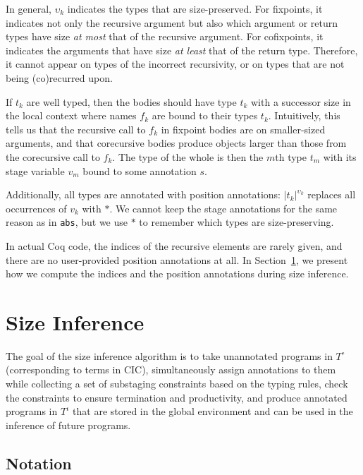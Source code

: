 \documentclass[sigplan,10pt,anonymous,review,nonacm]{acmart}
\begin{document}
In general, $\upsilon_k$ indicates the types that are size-preserved. For fixpoints, it indicates not only the recursive argument but also which argument or return types have size \textit{at most} that of the recursive argument. For cofixpoints, it indicates the arguments that have size \textit{at least} that of the return type. Therefore, it cannot appear on types of the incorrect recursivity, or on types that are not being (co)\-recurred upon. 

If $t_k$ are well typed, then the \cofixpoint bodies should have type $t_k$ with a successor size in the local context where \cofixpoint names $f_k$ are bound to their types $t_k$. Intuitively, this tells us that the recursive call to $f_k$ in fixpoint bodies are on smaller-sized arguments, and that corecursive bodies produce objects larger than those from the corecursive call to $f_k$. The type of the whole \cofixpoint is then the $m$th type $t_m$ with its stage variable $v_m$ bound to some annotation $s$.

Additionally, all \cofixpoint types are annotated with position annotations: $|t_k|^{\upsilon_k}$ replaces all occurrences of $v_k$ with $*$. We cannot keep the stage annotations for the same reason as in \texttt{abs}, but we use $*$ to remember which types are size-preserving.

In actual Coq code, the indices of the recursive elements are rarely given, and there are no user-provided position annotations at all. In Section~\ref{algorithm}, we present how we compute the indices and the position annotations during size inference.

\section{Size Inference}\label{algorithm}

The goal of the size inference algorithm is to take unannotated programs in $T^\circ$ (corresponding to terms in CIC), simultaneously assign annotations to them while collecting a set of substaging constraints based on the typing rules, check the constraints to ensure termination and productivity, and produce annotated programs in $T^\iota$ that are stored in the global environment and can be used in the inference of future programs.

\subsection{Notation}
\end{document}
